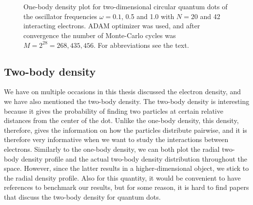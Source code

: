 \begin{figure}
	\centering
	\captionsetup[subfigure]{labelformat=empty}
	\hspace{0.1cm}
	\hspace{-0.5cm}
	\\
	
	\hspace{0.1cm}
	\hspace{-0.5cm}
	\\
	
	\hspace{0.1cm}
	\hspace{-0.5cm}
	
	\caption{One-body density plot for two-dimensional circular quantum dots of the oscillator frequencies $\omega=0.1$, 0.5 and 1.0 with $N=20$ and 42 interacting electrons. ADAM optimizer was used, and after convergence the number of Monte-Carlo cycles was $M=2^{28}=268,435,456$. For abbreviations see the text.}
	\label{fig:OB_interaction}
\end{figure}

\newpage
\subsection{Two-body density}
We have on multiple occasions in this thesis discussed the electron density, and we have also mentioned the two-body density. The two-body density is interesting because it gives the probability of finding two particles at certain relative distances from the center of the dot. Unlike the one-body density, this density, therefore, gives the information on how the particles distribute pairwise, and it is therefore very informative when we want to study the interactions between electrons. Similarly to the one-body density, we can both plot the radial two-body density profile and the actual two-body density distribution throughout the space. However, since the latter results in a higher-dimensional object, we stick to the radial density profile. Also for this quantity, it would be convenient to have references to benchmark our results, but for some reason, it is hard to find papers that discuss the two-body density for quantum dots.

